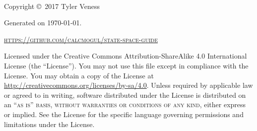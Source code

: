 \begingroup
\thispagestyle{empty}
\vfill
\endgroup

\newpage
~\vfill
\thispagestyle{empty}

Copyright \copyright\ 2017 Tyler Veness

Generated on \monthdayyeardate\today.

\textsc{\url{https://github.com/calcmogul/state-space-guide}}

Licensed under the Creative Commons Attribution-ShareAlike 4.0 International
License (the ``License''). You may not use this file except in compliance with
the License. You may obtain a copy of the License at
\url{http://creativecommons.org/licenses/by-sa/4.0}. Unless required by
applicable law or agreed to in writing, software distributed under the License
is distributed on an \textsc{``as is'' basis, without warranties or conditions
of any kind}, either express or implied. See the License for the specific
language governing permissions and limitations under the License.

\pagestyle{empty} %
\tableofcontents %
\cleardoublepage
\pagestyle{fancy} %
